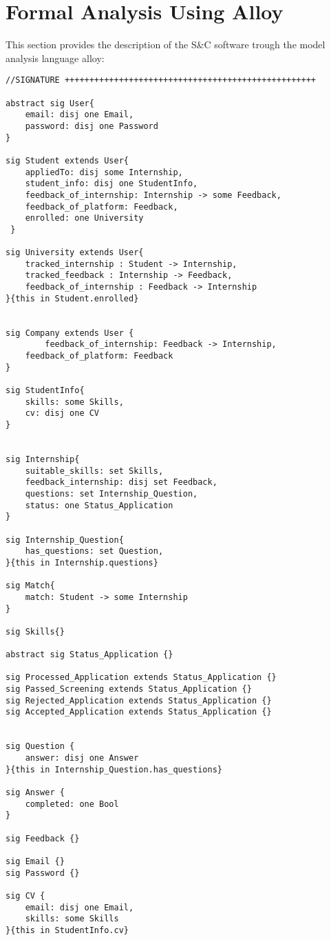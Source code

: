 \section{Formal Analysis Using Alloy}
This section provides the description of the S\&C software trough the model analysis language alloy:
\begin{lstlisting}
//SIGNATURE +++++++++++++++++++++++++++++++++++++++++++++++++++

abstract sig User{
    email: disj one Email,
    password: disj one Password
}

sig Student extends User{
	appliedTo: disj some Internship,
	student_info: disj one StudentInfo,
	feedback_of_internship: Internship -> some Feedback,
	feedback_of_platform: Feedback,
	enrolled: one University
 }

sig University extends User{
	tracked_internship : Student -> Internship,
	tracked_feedback : Internship -> Feedback,
	feedback_of_internship : Feedback -> Internship
}{this in Student.enrolled}


sig Company extends User {
    	feedback_of_internship: Feedback -> Internship,
	feedback_of_platform: Feedback
}

sig StudentInfo{
    skills: some Skills,
    cv: disj one CV
}


sig Internship{
	suitable_skills: set Skills,
	feedback_internship: disj set Feedback,
	questions: set Internship_Question,
	status: one Status_Application
}

sig Internship_Question{
	has_questions: set Question,
}{this in Internship.questions}

sig Match{
	match: Student -> some Internship
}

sig Skills{}

abstract sig Status_Application {}

sig Processed_Application extends Status_Application {}
sig Passed_Screening extends Status_Application {}
sig Rejected_Application extends Status_Application {}
sig Accepted_Application extends Status_Application {}


sig Question {
	answer: disj one Answer	
}{this in Internship_Question.has_questions}

sig Answer {
	completed: one Bool
}

sig Feedback {}

sig Email {}
sig Password {}

sig CV {
	email: disj one Email,
	skills: some Skills
}{this in StudentInfo.cv}



\end{lstlisting}
